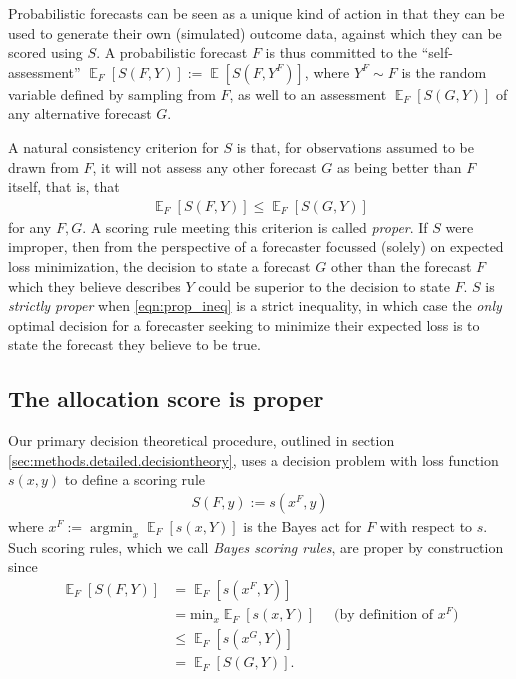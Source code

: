 \documentclass{article}\usepackage[]{graphicx}\usepackage[]{xcolor}
\DeclareMathOperator*{\argmin}{argmin}
\DeclareMathOperator{\Ex}{\mathbb{E}}
\begin{document}
Probabilistic forecasts can be seen as a unique kind of action in that they can be used to generate their own
(simulated) outcome data, against which they can be scored using $S$. A probabilistic forecast $F$ is thus committed to
the ``self-assessment'' $\Ex_F [S(F, Y)] := \Ex [S(F, Y^F)]$, where $Y^F \sim F$ is the random variable defined by
sampling from $F$, as well to an assessment $\Ex_F [S(G, Y)]$ of any alternative forecast $G$.

A natural consistency criterion for $S$ is that, for observations assumed to be drawn from $F$, it will not assess any
other forecast $G$ as being better than $F$ itself, that is, that
\begin{align}
\Ex_F [S(F, Y)] \leq \Ex_F [S(G, Y)] \label{eqn:prop_ineq}
\end{align}
for any $F,G$. A scoring rule meeting this criterion is called \emph{proper}. If $S$ were improper, then from the
perspective of a forecaster focussed (solely) on expected loss minimization, the decision to state a forecast $G$ other
than the forecast $F$ which they believe describes $Y$ could be superior to the decision to state $F$. $S$ is
\emph{strictly proper} when \eqref{eqn:prop_ineq} is a strict inequality, in which case the \emph{only} optimal decision
for a forecaster seeking to minimize their expected loss is to state the forecast they believe to be true.

\subsection{The allocation score is proper}
\label{sec:a:alloscore_proper}

Our primary decision theoretical procedure, outlined in section \ref{sec:methods.detailed.decisiontheory},
uses a decision problem with loss function $s(x,y)$ to define a scoring rule
\begin{align}
S(F,y) := s(x^F,y) \label{eqn:bayes_sr}
\end{align}
where $x^F := \argmin_{x} \Ex_F[s(x,Y)]$ is the Bayes act for $F$ with respect to $s$.
Such scoring rules, which we call \emph{Bayes scoring rules},
are proper by construction since
\begin{align}
\Ex_F [S(F, Y)] &= \Ex_F [ s(x^F, Y) ] \nonumber \\
 &= \mathrm{min}_{x} \Ex_F [ s(x, Y) ] \quad \text{ (by definition of $x^F$)} \\
 &\leq \Ex_F [ s(x^G, Y) ] \label{eqn:dt_proper_key} \\
 &= \Ex_F [ S(G, Y)]. \nonumber
\end{align}
\end{document}
